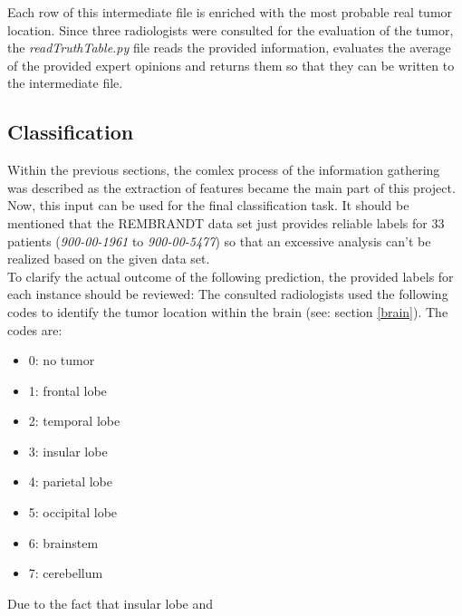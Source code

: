 \documentclass[twoside,11pt]{article}
\begin{document}
	Each row of this intermediate file is enriched with the most probable real tumor location. Since three radiologists were consulted for the evaluation of the tumor, the \textit{readTruthTable.py} file reads the provided information, evaluates the average of the provided expert opinions and returns them so that they can be written to the intermediate file.
	
\subsection{Classification}
	Within the previous sections, the comlex process of the information gathering was described as the extraction of features became the main part of this project. Now, this input can be used  for the final classification task. It should be mentioned that the REMBRANDT data set just provides reliable labels for 33 patients (\textit{900-00-1961} to \textit{900-00-5477}) so that an excessive analysis can't be realized based on the given data set. \\
	To clarify the actual outcome of the following prediction, the provided labels for each instance should be reviewed: The consulted radiologists used the following codes to identify the tumor location within the brain (see: section \ref{brain}). The codes are:
	\begin{itemize}
		\item 0: no tumor
		\item 1: frontal lobe
		\item 2: temporal lobe
		\item 3: insular lobe
		\item 4: parietal lobe
		\item 5: occipital lobe
		\item 6: brainstem 
		\item 7: cerebellum
	\end{itemize}

	Due to the fact that insular lobe and 
	

\end{document}
